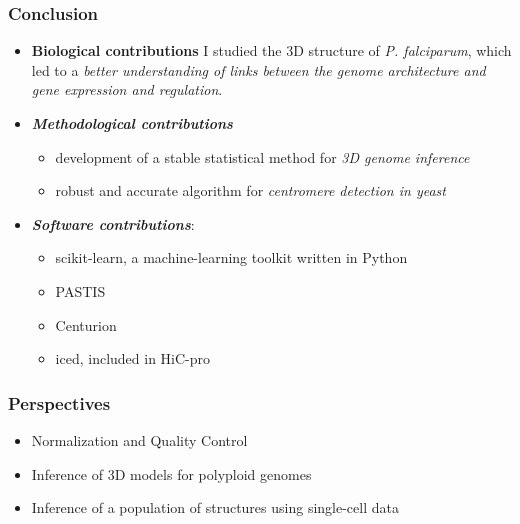 \documentclass[xcolor=dvipsnames]{beamer}
\begin{document}
\begin{frame}
\frametitle{Conclusion}
\begin{itemize}[label={$\bullet$}]
\item \textbf{Biological contributions} I
studied the 3D structure of {\em P. falciparum}, which led to a \textit{better
understanding of links between the genome architecture and gene expression and
regulation}.
\item \textbf{\em Methodological contributions}
\begin{itemize}[label={$\bullet$}]
\item development of a stable statistical method for \textit{3D genome
inference}
\item robust and accurate algorithm for \textit{centromere detection in yeast} 
\end{itemize}
\item \textbf{\em Software contributions}: 
\begin{itemize}[label={$\bullet$}]
\item scikit-learn, a machine-learning toolkit written in Python
\item PASTIS
\item Centurion
\item iced, included in HiC-pro
\end{itemize}
\end{itemize}
\end{frame}

\begin{frame}
\frametitle{Perspectives}
\begin{itemize}[label={$\bullet$}]
\item Normalization and Quality Control
\item Inference of 3D models for polyploid genomes
\item Inference of a population of structures using single-cell data
\end{itemize}
\end{frame}
\end{document}
